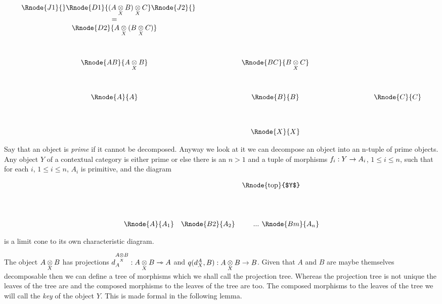\documentclass[10pt,a4paper]{scrartcl}
\begin{document}
\begin{displaymath}
\begin{array}{cp{1.0cm}cp{1.0cm}c}
\Rnode{J1}{}\Rnode{D1} {\crossx{(\crossx{A}{B}{X})}{C}{X}}\Rnode{J2}{} \ \ \ \ \   &&  &&  \\ 
= && && \\
\Rnode{D2} {\crossx{A}{(\crossx{B}{C}{X})}{X}}    &&  &&                        \\ [1.3cm]
\Rnode{AB}{\crossx{A}{B}{X}}&& \Rnode{BC}{\crossx{B}{C}{X}} &&                      \\[1.3cm]
\Rnode{A}{A}&& \Rnode{B}{B} && \ \ \ \ \ \ \ \ \ \ \ \ \ \Rnode{C}{C}                                        \\[1.3cm]
             && \Rnode{X}{X} &&                                                     
\end{array}
\end{displaymath}


\noindent Say that an object is \textit{prime} if it cannot be decomposed.
\noindent Anyway we look at it we can decompose an object into an n-tuple of prime objects. 
\noindent Any object $Y$ of a contextual category \ccat is either prime or else there is an $n > 1$ and a tuple of morphisms $f_i: Y \morph A_i$, $1 \leq i \leq n$, such that for each $i$, $1 \leq i \leq n$,  $A_i$ is primitive, 
and the diagram
\begin{center}
\setlength{\arraycolsep}{0.3cm}
\begin{displaymath}
\begin{array}{ccp{0.2cm}p{0.075cm}c}
&&\Rnode{top}{$Y$}& & \\[1.5cm]
\Rnode{A}{A_1}&\Rnode{B2}{A_2}&& ... & \Rnode{Bm}{A_n}\\
\end{array}
\end{displaymath}
\end{center}
 is a limit cone to its own characteristic diagram.

\noindent The object $\crossx{A}{B}{X}$ has projections $\pc{\crossx{A}{B}{X}}{A}: \crossx{A}{B}{X} \smorph A$ and
$q(\pc{A}{X},B): \crossx{A}{B}{X} \morph B$. Given that  $A$ and $B$ are maybe themselves decomposable then we  can define a tree of morphisms which we shall call the projection tree. Whereas the projection tree is not unique the leaves of the tree are and the composed morphisms to the leaves of the tree are too. The composed morphisms to the leaves of the tree we
will call the \textit{key} of the object $Y$. This is made formal in the following lemma.



\end{document}
